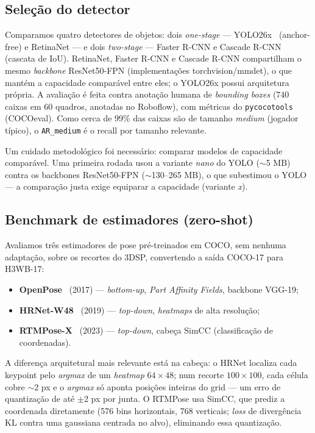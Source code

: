 \documentclass[12pt]{article}
\begin{document}
\subsection{Seleção do detector}

Comparamos quatro detectores de objetos: dois \emph{one-stage} --- YOLO26x~\cite{ultralytics} (anchor-free) e RetinaNet --- e dois \emph{two-stage} --- Faster R-CNN e Cascade R-CNN (cascata de IoU). RetinaNet, Faster R-CNN e Cascade R-CNN compartilham o mesmo \emph{backbone} ResNet50-FPN (implementações torchvision/mmdet), o que mantém a capacidade comparável entre eles; o YOLO26x possui arquitetura própria. A avaliação é feita contra anotação humana de \emph{bounding boxes} (740 caixas em 60 quadros, anotadas no Roboflow), com métricas do \texttt{pycocotools} (COCOeval). Como cerca de 99\% das caixas são de tamanho \emph{medium} (jogador típico), o \texttt{AR\_medium} é o recall por tamanho relevante.

Um cuidado metodológico foi necessário: comparar modelos de capacidade comparável. Uma primeira rodada usou a variante \emph{nano} do YOLO ($\sim$5 MB) contra os backbones ResNet50-FPN ($\sim$130--265 MB), o que subestimou o YOLO --- a comparação justa exige equiparar a capacidade (variante \emph{x}).

\subsection{Benchmark de estimadores (zero-shot)}

Avaliamos três estimadores de pose pré-treinados em COCO, sem nenhuma adaptação, sobre os recortes do 3DSP, convertendo a saída COCO-17 para H3WB-17:

\begin{itemize}
  \item \textbf{OpenPose}~\cite{cao2017} (2017) --- \emph{bottom-up}, \emph{Part Affinity Fields}, backbone VGG-19;
  \item \textbf{HRNet-W48}~\cite{sun2019} (2019) --- \emph{top-down}, \emph{heatmaps} de alta resolução;
  \item \textbf{RTMPose-X}~\cite{jiang2023} (2023) --- \emph{top-down}, cabeça SimCC (classificação de coordenadas).
\end{itemize}

A diferença arquitetural mais relevante está na cabeça: o HRNet localiza cada keypoint pelo \emph{argmax} de um \emph{heatmap} $64\times48$; num recorte $100\times100$, cada célula cobre $\sim$2 px e o \emph{argmax} só aponta posições inteiras do grid --- um erro de quantização de até $\pm$2 px por junta. O RTMPose usa SimCC, que prediz a coordenada diretamente (576 bins horizontais, 768 verticais; \emph{loss} de divergência KL contra uma gaussiana centrada no alvo), eliminando essa quantização.
\end{document}
